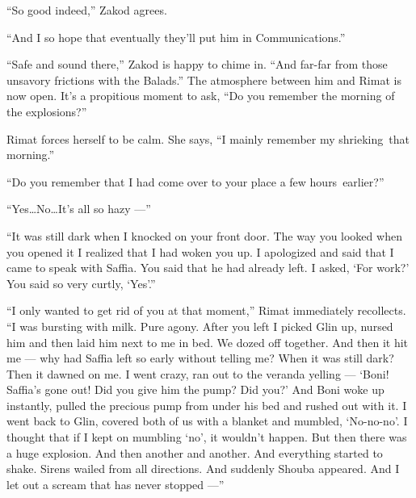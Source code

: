 \documentclass[twoside,11pt,openany]{book}
\begin{document}
``So good indeed,'' Zakod agrees.

``And I so hope that eventually they'll put him in Communications.''

``Safe and sound there,'' Zakod is happy to chime in. ``And far-far from those
unsavory frictions with the Balads.'' The atmosphere between him and Rimat is now open. It's a propitious
moment to ask, ``Do you remember the morning of the explosions?''

Rimat forces herself to be calm. She says, ``I mainly remember my shrieking~that morning.''

``Do you remember that I had come over to your place a few hours~earlier?''

``Yes{\ldots}No{\ldots}It's all so hazy ---''

``It was still dark when I knocked on your front door. The way you looked when you opened it I realized
that I had woken you up. I apologized and said that I came to speak with Saffia. You said that he had already left. I
asked, `For work?' You said so very curtly, `Yes'.''

``I only wanted to get rid of you at that moment,'' Rimat immediately recollects.
``I was bursting with milk. Pure agony. After you left I picked Glin up, nursed{ }him and
then laid him next to me in bed. We dozed off together. And then it hit me --- why had Saffia left so early without
telling me? When it was still dark? Then it dawned{ }on me. I went crazy, ran out to the veranda
yelling --- `Boni! Saffia's gone out! Did you give him the pump? Did you?' And Boni woke up instantly, pulled the
precious pump from under his bed and rushed out with it. I went back to Glin, covered both of us with a blanket and
mumbled, `No-no-no'. I thought that if I kept on mumbling `no', it wouldn't happen. But then there was a huge
explosion. And then another and another. And everything started to shake.  Sirens wailed from all directions. And
suddenly Shouba appeared. And I let out a scream that has never stopped ---''
\end{document}
